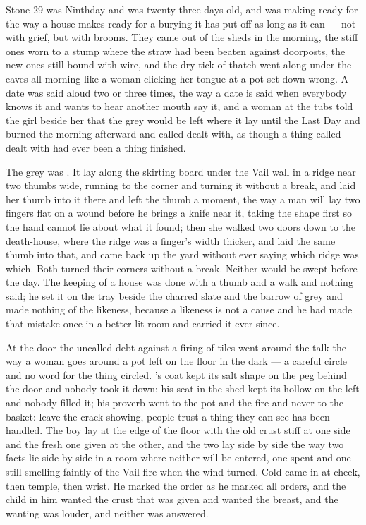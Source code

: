 
Stone 29 was Ninthday and  was twenty-three days old, and  was making ready for  the way a house makes ready for a burying it has put off as long as it can --- not with grief, but with brooms. They came out of the sheds in the morning, the stiff ones worn to a stump where the straw had been beaten against doorposts, the new ones still bound with wire, and the dry tick of thatch went along under the  eaves all morning like a woman clicking her tongue at a pot set down wrong. A date was said aloud two or three times, the way a date is said when everybody knows it and wants to hear another mouth say it, and a woman at the tubs told the girl beside her that the grey would be left where it lay until the Last Day and burned the morning afterward and called dealt with, as though a thing called dealt with had ever been a thing finished.

The grey was . It lay along the skirting board under the Vail wall in a ridge near two thumbs wide, running to the corner and turning it without a break, and  laid her thumb into it there and left the thumb a moment, the way a man will lay two fingers flat on a wound before he brings a knife near it, taking the shape first so the hand cannot lie about what it found; then she walked two doors down to the death-house, where the ridge was a finger's width thicker, and laid the same thumb into that, and came back up the yard without ever saying which ridge was which. Both turned their corners without a break. Neither would be swept before the day. The keeping of a house was done with a thumb and a walk and nothing said; he set it on the tray beside the charred slate and the barrow of grey and made nothing of the likeness, because a likeness is not a cause and he had made that mistake once in a better-lit room and carried it ever since.

At the door the uncalled debt against a firing of tiles went around the talk the way a woman goes around a pot left on the floor in the dark --- a careful circle and no word for the thing circled. 's coat kept its salt shape on the peg behind the door and nobody took it down; his seat in the shed kept its hollow on the left and nobody filled it; his proverb went to the pot and the fire and never to the basket: leave the crack showing, people trust a thing they can see has been handled. The boy lay at the edge of the floor with the old crust stiff at one side and the fresh one given at the other, and the two lay side by side the way two facts lie side by side in a room where neither will be entered, one spent and one still smelling faintly of the Vail fire when the wind turned. Cold came in at cheek, then temple, then wrist. He marked the order as he marked all orders, and the child in him wanted the crust that was given and wanted the breast, and the wanting was louder, and neither was answered.

